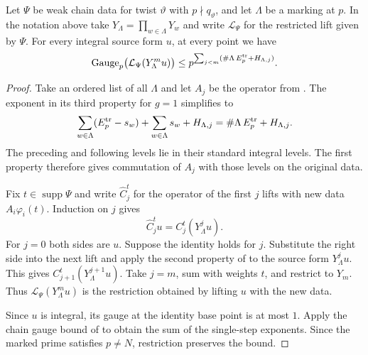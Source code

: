 \begin{lemma}
\label{lem:a-marked-hecke-chain-gauge}
\emitthmsource
Let $\Psi$ be weak chain data for twist $\vartheta$ with $p\nmid q_\vartheta$, and let $\Lambda$ be a marking at $p$. In the notation above take $Y_\Lambda=\prod_{w\in\Lambda}Y_w$ and write $\mathcal L_\Psi$ for the restricted lift given by $\Psi$. For every integral source form $u$, at every point we have
\[
 \operatorname{Gauge}_p\bigl(\mathcal L_\Psi(Y_\Lambda^m u)\bigr)
 \le p^{\sum_{j<m}(\#\Lambda\,E_p^{\rm tr}+H_{\Lambda,j})}.
\]
\end{lemma}
\begin{proof}
Take an ordered list of all $\Lambda$ and let $A_j$ be the operator from . The exponent in its third property for $g=1$ simplifies to
\[
 \sum_{w\in\Lambda}(E_p^{\rm tr}-s_w)+\sum_{w\in\Lambda}s_w+
 H_{\Lambda,j}=\#\Lambda\,E_p^{\rm tr}+H_{\Lambda,j}.
\]
The preceding and following levels lie in their standard integral levels. The first property therefore gives commutation of $A_j$ with those levels on the original data.

Fix $t\in\operatorname{supp}\Psi$ and write $\widehat C_j^t$ for the operator of the first $j$ lifts with new data $A_i\varphi_i(t)$. Induction on $j$ gives
\[
 \widehat C_j^t u=C_j^t(Y_\Lambda^j u).
\]
For $j=0$ both sides are $u$. Suppose the identity holds for $j$. Substitute the right side into the next lift and apply the second property of  to the source form $Y_\Lambda^ju$. This gives $C_{j+1}^t(Y_\Lambda^{j+1}u)$. Take $j=m$, sum with weights $t$, and restrict to $Y_m$. Thus $\mathcal L_\Psi(Y_\Lambda^mu)$ is the restriction obtained by lifting $u$ with the new data.

Since $u$ is integral, its gauge at the identity base point is at most $1$. Apply the chain gauge bound of  to obtain the sum of the single-step exponents. Since the marked prime satisfies $p\ne N$, restriction preserves the bound.
\end{proof}

